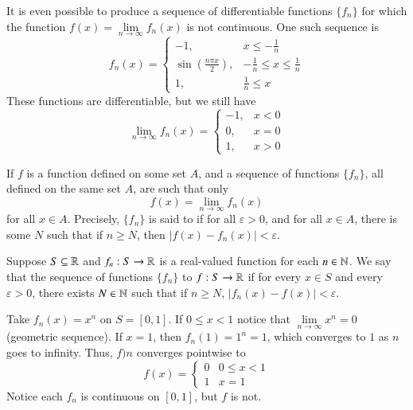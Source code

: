 \begin{eg}
    It is even possible to produce a sequence of differentiable functions $\{f_n\}$ for which the function $f(x) = \lim\limits_{n\rightarrow \infty}f_n(x)$ is not continuous. One such sequence is \begin{equation*}
        f_n(x) = \left\{\begin{array}{lc} -1, &  x \leq -\frac{1}{n} \\ \sin\left(\frac{n\pi x}{2}\right), & -\frac{1}{n} \leq x \leq \frac{1}{n} \\ 1, & \frac{1}{n} \leq x \end{array}\right.
    \end{equation*}
    These functions are differentiable, but we still have  \begin{equation*}
        \lim\limits_{n\rightarrow \infty}f_n(x) = \left\{\begin{array}{lc} -1, & x < 0 \\ 0, & x = 0 \\ 1, & x > 0 \end{array}\right.
    \end{equation*}
\end{eg}

\begin{defn}
    If $f$ is a function defined on some set $A$, and a sequence of functions $\{f_n\}$, all defined on the same set $A$, are such that only \begin{equation*}
        f(x) = \lim\limits_{n\rightarrow \infty}f_n(x)
    \end{equation*}
    for all $x \in A$. Precisely, $\{f_n\}$ is said to  if for all $\varepsilon > 0$, and for all $x \in A$, there is some $N$ such that if $n \geq N$, then $|f(x) - f_n(x)| < \varepsilon$.
\end{defn}

\begin{defn}
    Suppose $S \subseteq \mathbb R$ and $f_n:S\rightarrow \mathbb R$ is a real-valued function for each $n \in \mathbb N$. We say that the sequence of functions $\{f_n\}$  to $f:S\rightarrow \mathbb R$ if for every $x \in S$ and every $\varepsilon > 0$, there exists $N \in \mathbb N$ such that if $n \geq N$, $|f_n(x) - f(x)| < \varepsilon$.
\end{defn}

\begin{eg}
    Take $f_n(x) = x^n$ on $S = [0,1]$. If $0 \leq x < 1$ notice that $\lim\limits_{n\rightarrow \infty}x^n = 0$ (geometric sequence). If $x = 1$, then $f_n(1) = 1^n = 1$, which converges to $1$ as $n$ goes to infinity. Thus, $f)n$ converges pointwise to \begin{equation*}
        f(x) = \left\{\begin{array}{lc} 0 & 0 \leq x < 1 \\ 1 & x = 1\end{array}\right.
    \end{equation*}
    Notice each $f_n$ is continuous on $[0,1]$, but $f$ is not.
\end{eg}

